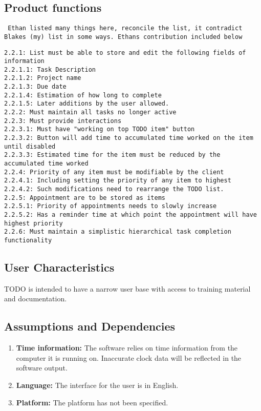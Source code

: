 \documentclass[12pt,a4paper]{article}
\begin{document}
\subsection{Product functions}
{\tt
Ethan listed many things here, reconcile the list, it contradict Blakes (my) list in some ways. Ethans contribution included below\\}
\begin{verbatim}
2.2.1: List must be able to store and edit the following fields of information
2.2.1.1: Task Description
2.2.1.2: Project name
2.2.1.3: Due date
2.2.1.4: Estimation of how long to complete
2.2.1.5: Later additions by the user allowed.
2.2.2: Must maintain all tasks no longer active
2.2.3: Must provide interactions
2.2.3.1: Must have "working on top TODO item" button 
2.2.3.2: Button will add time to accumulated time worked on the item until disabled
2.2.3.3: Estimated time for the item must be reduced by the accumulated time worked
2.2.4: Priority of any item must be modifiable by the client
2.2.4.1: Including setting the priority of any item to highest
2.2.4.2: Such modifications need to rearrange the TODO list.
2.2.5: Appointment are to be stored as items
2.2.5.1: Priority of appointments needs to slowly increase
2.2.5.2: Has a reminder time at which point the appointment will have highest priority
2.2.6: Must maintain a simplistic hierarchical task completion functionality
\end{verbatim}

\subsection{User Characteristics}
TODO is intended to have a narrow user base with access to training material and documentation. 


\subsection{Assumptions and Dependencies}
\begin{enumerate}
\item \textbf{Time information:} The software relies on time information from the computer it is running on. Inaccurate clock data will be reflected in the software output. 
\item \textbf{Language:} The interface for the user is in English.
\item \textbf{Platform:} The platform has not been specified.
\end{enumerate}
\end{document}
